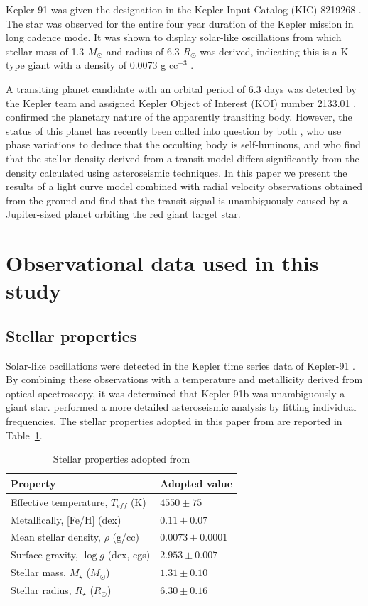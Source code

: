 \documentclass[apjl]{emulateapj}
\begin{document}
Kepler-91 was given the designation in the Kepler Input Catalog (KIC) 8219268 \citep{brown11}. The star was observed for the entire four year duration of the Kepler mission in long cadence mode. It was shown to display solar-like oscillations from which stellar mass of 1.3 $M_\odot$ and radius of 6.3 $R_\odot$ was derived, indicating this is a K-type giant with a density of 0.0073 g cc$^{-3}$ \citep{huber13,lillo14}.

A transiting planet candidate with an orbital period of 6.3 days was detected by the Kepler team and assigned Kepler Object of Interest (KOI) number 2133.01 \citep{batalha12}. \citet{lillo14} confirmed the planetary nature of the apparently transiting body. However, the status of this planet has recently been called into question by both \citet{esteves13}, who use phase variations to deduce that the occulting body is self-luminous, and \citet{sliski14} who find that the stellar density derived from a transit model differs significantly from the density calculated using asteroseismic techniques. In this paper we present the results of a light curve model combined with radial velocity observations obtained from the ground and find that the transit-signal is unambiguously caused by a Jupiter-sized planet orbiting the red giant target star.


\section{Observational data used in this study}

\subsection{Stellar properties}
Solar-like oscillations were detected in the Kepler time series data of Kepler-91 \citep{huber13}. By combining these observations with a temperature and metallicity derived from optical spectroscopy, it was determined that Kepler-91b was unambiguously a giant star. \citet{lillo14} performed a more detailed asteroseismic analysis by fitting individual frequencies. The stellar properties adopted in this paper from \citeauthor{lillo14} are reported in Table~\ref{tab:stellar}.

\begin{table}
\centering
\caption{Stellar properties adopted from \citet{lillo14}}\label{tab:stellar}
\begin{tabular}{l l }
Property & Adopted value \\
\hline
Effective temperature, $T_{eff}$ (K)		&	$4550\pm75$ \\
Metallically, [Fe/H] (dex)				& 	$0.11 \pm0.07$\\
Mean stellar density, $\rho$ (g/cc)		&	$0.0073 \pm0.0001$ \\
Surface gravity, $\log{g}$ (dex, cgs)		&	$2.953 \pm 0.007$ \\
Stellar mass, $M_\star$ ($M_\odot$)		&	$1.31 \pm 0.10$\\
Stellar radius, $R_\star$ ($R_\odot$)		&	$6.30 \pm 0.16$ \\
\hline
\end{tabular}
\end{table}
\end{document}

